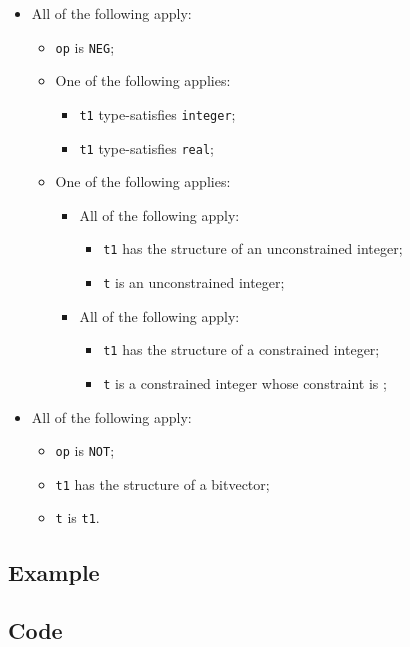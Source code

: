 \documentclass{book}
\begin{document}
\begin{itemize}
  \item All of the following apply:
    \begin{itemize}
    \item \texttt{op} is \texttt{NEG};
    \item One of the following applies:
      \begin{itemize}
      \item \texttt{t1} type-satisfies \texttt{integer};
      \item \texttt{t1} type-satisfies \texttt{real};
      \end{itemize}
     \item One of the following applies:
       \begin{itemize}
       \item All of the following apply:
         \begin{itemize}
         \item \texttt{t1} has the structure of an unconstrained integer;
         \item \texttt{t} is an unconstrained integer;
         \end{itemize}
       \item All of the following apply:
         \begin{itemize}
         \item \texttt{t1} has the structure of a constrained integer;
         \item \texttt{t} is a constrained integer whose constraint is ;
         \end{itemize}
       \end{itemize}
    \end{itemize}

  \item All of the following apply:
    \begin{itemize}
    \item \texttt{op} is \texttt{NOT};
    \item \texttt{t1} has the structure of a bitvector;
    \item \texttt{t} is \texttt{t1}.
    \end{itemize}
  \end{itemize}

  \subsection{Example}

  \subsection{Code}
\end{document}
